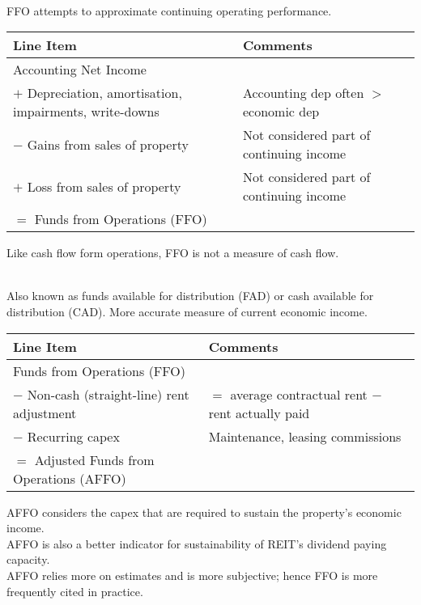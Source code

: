 \begin{definition} \\
FFO attempts to approximate continuing operating performance.\\
\begin{tabularx}{\textwidth}{p{25em}|X}
\hline
\rowcolor{gray!30}
Line Item & Comments \\
\hline
Accounting Net Income & \\
$+$ Depreciation, amortisation, impairments, write-downs & Accounting dep often $>$ economic dep \\
$-$ Gains from sales of property & Not considered part of continuing income \\
$+$ Loss from sales of property & Not considered part of continuing income \\
\hline
$=$ Funds from Operations (FFO) & \\
\hline
\end{tabularx}
Like cash flow form operations, FFO is not a measure of cash flow.
\end{definition}

\begin{definition} \\
Also known as funds available for distribution (FAD) or cash available for distribution (CAD). More accurate measure of current economic income.\\
\begin{tabularx}{\textwidth}{p{25em}|X}
\hline
\rowcolor{gray!30}
Line Item & Comments \\
\hline
Funds from Operations (FFO) & \\
$-$ Non-cash (straight-line) rent adjustment & $=$ average contractual rent $-$ rent actually paid \\
$-$ Recurring capex & Maintenance, leasing commissions \\
\hline
$=$ Adjusted Funds from Operations (AFFO) & \\
\hline
\end{tabularx}
AFFO considers the capex that are required to sustain the property's economic income.\\
AFFO is also a better indicator for sustainability of REIT's dividend paying capacity.\\
AFFO relies more on estimates and is more subjective; hence FFO is more frequently cited in practice.
\end{definition}

